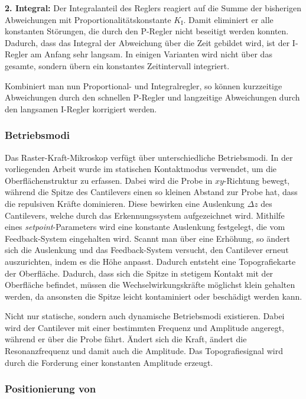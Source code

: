 \textbf{2. Integral:}
Der Integralanteil des Reglers reagiert auf die Summe der bisherigen Abweichungen mit Proportionalitätskonstante
$K_{\mathrm{I}}$.
Damit eliminiert er alle konstanten Störungen, die durch den P-Regler nicht beseitigt werden konnten.
Dadurch, dass das Integral der Abweichung über die Zeit gebildet wird, ist der I-Regler am Anfang sehr langsam.
In einigen Varianten wird nicht über das gesamte, sondern übern ein konstantes Zeitintervall integriert.\autocite[102-104]{afm-buch}

Kombiniert man nun Proportional- und Integralregler, so können kurzzeitige Abweichungen durch den schnellen
P-Regler und langzeitige Abweichungen durch den langsamen I-Regler korrigiert werden.\autocite[104-105]{afm-buch}

\subsubsection{Betriebsmodi}
Das Raster-Kraft-Mikroskop verfügt über unterschiedliche Betriebsmodi.
In der vorliegenden Arbeit wurde im statischen Kontaktmodus verwendet, um die Oberflächenstruktur zu erfassen.
Dabei wird die Probe in $xy$-Richtung bewegt, während die Spitze des Cantilevers einen so kleinen Abstand zur Probe hat,
dass die repulsiven Kräfte dominieren.
Diese bewirken eine Auslenkung $\Delta z$ des Cantilevers, welche durch das Erkennungssystem aufgezeichnet wird.
Mithilfe eines \textit{setpoint}-Parameters wird eine konstante Auslenkung festgelegt, die vom Feedback-System eingehalten
wird.
Scannt man über eine Erhöhung, so ändert sich die Auslenkung und das Feedback-System versucht, den Cantilever erneut
auszurichten, indem es die Höhe anpasst.
Dadurch entsteht eine Topografiekarte der Oberfläche.
Dadurch, dass sich die Spitze in stetigem Kontakt mit der Oberfläche befindet, müssen die Wechselwirkungskräfte möglichst klein gehalten werden,
da ansonsten die Spitze leicht kontaminiert oder beschädigt werden kann.\autocite[199-201]{afm-buch}

Nicht nur statische, sondern auch dynamische Betriebsmodi existieren.
Dabei wird der Cantilever mit einer bestimmten Frequenz und Amplitude angeregt, während er über die Probe fährt.
Ändert sich die Kraft, ändert die Resonanzfrequenz und damit auch die Amplitude.
Das Topografiesignal wird durch die Forderung einer konstanten Amplitude erzeugt.\autocite[209]{afm-buch}

\subsubsection{Positionierung von }


